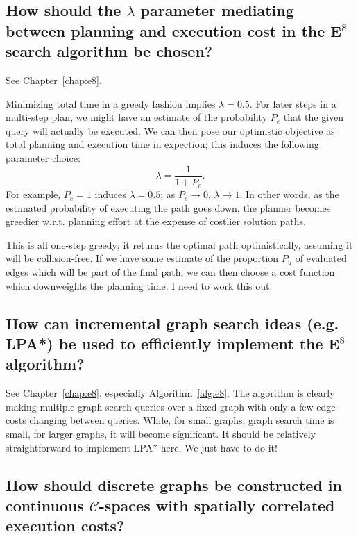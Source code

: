 {
\renewcommand\thesubsection{Q\arabic{subsection}}

\subsection{How should the $\lambda$ parameter mediating
   between planning and execution cost in the E$^8$
   search algorithm be chosen?}
\label{ques:choosing-lambda}

See Chapter~\ref{chap:e8}.

Minimizing total time in a greedy fashion implies $\lambda = 0.5$.
For later steps in a multi-step plan,
we might have an estimate of the probability $P_e$ that the given query will
actually be executed.
We can then pose our optimistic objective as total planning and execution
time in expection;
this induces the following parameter choice:
\begin{equation}
   \lambda = \frac{1}{1 + P_e} .
\end{equation}
For example, $P_e=1$ induces $\lambda = 0.5$;
as $P_e \rightarrow 0$, $\lambda \rightarrow 1$.
In other words,
as the estimated probability of executing the path goes down,
the planner becomes greedier w.r.t. planning effort at the expense of
costlier solution paths.

This is all one-step greedy;
it returns the optimal path optimistically,
assuming it will be collision-free.
If we have some estimate of the proportion $P_u$ of evaluated edges
which will be part of the final path,
we can then choose a cost function which downweights the planning time.
I need to work this out.

\subsection{How can incremental graph search ideas (e.g. LPA*)
   be used to efficiently implement the E$^8$ algorithm?}
\label{ques:incremental-search}

See Chapter~\ref{chap:e8}, especially Algorithm~\ref{alg:e8}.
The algorithm is clearly making multiple graph search queries
over a fixed graph with only a few edge costs changing between queries.
While, for small graphs, graph search time is small,
for larger graphs,
it will become significant.
It should be relatively straightforward to implement LPA* here.
We just have to do it!

\subsection{How should discrete graphs be constructed in continuous
   $\mathcal{C}$-spaces with spatially correlated execution costs?}
\label{ques:batching}

}
